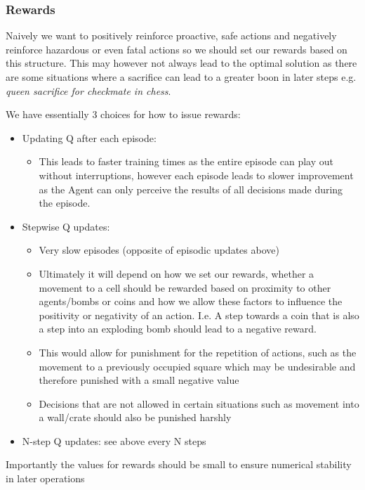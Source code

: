 \documentclass[12pt]{report}
\begin{document}
\subsubsection{Rewards}
Naively we want to positively reinforce proactive, safe actions and negatively reinforce hazardous or even fatal actions so we should set our rewards based on this structure. This may however not always lead to the optimal solution as there are some situations where a sacrifice can lead to a greater boon in later steps e.g. \textit{queen sacrifice for checkmate in chess}.

We have essentially 3 choices for how to issue rewards:
\begin{itemize}
	\item Updating Q after each episode:
	\begin{itemize}
		\item This leads to faster training times as the entire episode can play out without interruptions, however each episode leads to slower improvement as the Agent can only perceive the results of all decisions made during the episode.
	\end{itemize}

	\item Stepwise Q updates:
	\begin{itemize}
		\item Very slow episodes (opposite of episodic updates above)
		\item Ultimately it will depend on how we set our rewards, whether a movement to a cell should be rewarded based on proximity to other agents/bombs or coins and how we allow these factors to influence the positivity or negativity of an action. I.e. A step towards a coin that is also a step into an exploding bomb should lead to a negative reward.
		\item This would allow for punishment for the repetition of actions, such as the movement to a previously occupied square which may be undesirable and therefore punished with a small negative value
		\item Decisions that are not allowed in certain situations such as movement into a wall/crate should also be punished harshly
	\end{itemize}			
	\item N-step Q updates: see above every N steps
\end{itemize}

Importantly the values for rewards should be small to ensure numerical stability in later operations
\end{document}
